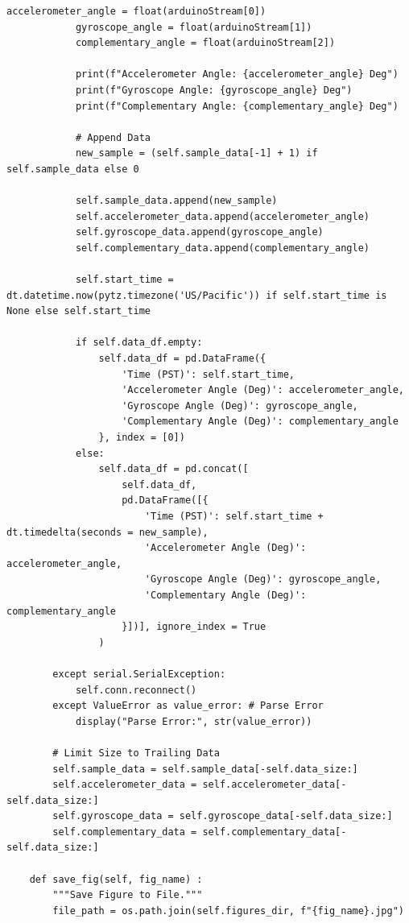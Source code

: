 \documentclass{article}
\begin{document}
\begin{lstlisting}[caption={Python Stripchart}, label={lst:stripchart_code}]
            accelerometer_angle = float(arduinoStream[0])
            gyroscope_angle = float(arduinoStream[1])
            complementary_angle = float(arduinoStream[2])

            print(f"Accelerometer Angle: {accelerometer_angle} Deg")
            print(f"Gyroscope Angle: {gyroscope_angle} Deg")
            print(f"Complementary Angle: {complementary_angle} Deg")

            # Append Data
            new_sample = (self.sample_data[-1] + 1) if self.sample_data else 0

            self.sample_data.append(new_sample)
            self.accelerometer_data.append(accelerometer_angle)
            self.gyroscope_data.append(gyroscope_angle)
            self.complementary_data.append(complementary_angle)

            self.start_time = dt.datetime.now(pytz.timezone('US/Pacific')) if self.start_time is None else self.start_time

            if self.data_df.empty:
                self.data_df = pd.DataFrame({
                    'Time (PST)': self.start_time,
                    'Accelerometer Angle (Deg)': accelerometer_angle,
                    'Gyroscope Angle (Deg)': gyroscope_angle,
                    'Complementary Angle (Deg)': complementary_angle
                }, index = [0])
            else:
                self.data_df = pd.concat([
                    self.data_df,
                    pd.DataFrame([{
                        'Time (PST)': self.start_time + dt.timedelta(seconds = new_sample),
                        'Accelerometer Angle (Deg)': accelerometer_angle,
                        'Gyroscope Angle (Deg)': gyroscope_angle,
                        'Complementary Angle (Deg)': complementary_angle
                    }])], ignore_index = True
                )

        except serial.SerialException:
            self.conn.reconnect()
        except ValueError as value_error: # Parse Error
            display("Parse Error:", str(value_error))

        # Limit Size to Trailing Data
        self.sample_data = self.sample_data[-self.data_size:]
        self.accelerometer_data = self.accelerometer_data[-self.data_size:]
        self.gyroscope_data = self.gyroscope_data[-self.data_size:]
        self.complementary_data = self.complementary_data[-self.data_size:]

    def save_fig(self, fig_name) :
        """Save Figure to File."""
        file_path = os.path.join(self.figures_dir, f"{fig_name}.jpg")


\end{lstlisting}
\end{document}
